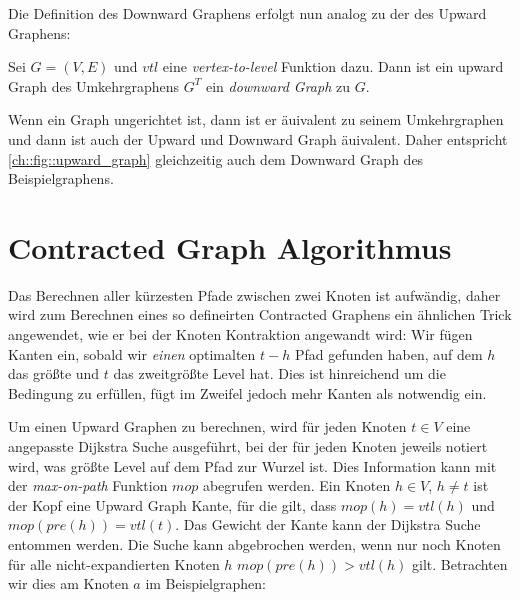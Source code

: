 Die Definition des Downward Graphens erfolgt nun analog zu der des Upward Graphens:

\begin{definition}
    Sei $G = (V, E)$ und ${vtl}$ eine \emph{vertex-to-level} Funktion dazu. Dann ist ein upward Graph des Umkehrgraphens $G^T$ ein \emph{downward Graph} zu $G$.
\end{definition}

Wenn ein Graph ungerichtet ist, dann ist er äuivalent zu seinem Umkehrgraphen und dann ist auch der Upward und Downward Graph äuivalent.
Daher entspricht \autoref{ch::fig::upward_graph} gleichzeitig auch dem Downward Graph des Beispielgraphens.


\section{Contracted Graph Algorithmus}

Das Berechnen aller kürzesten Pfade zwischen zwei Knoten ist aufwändig, daher wird zum Berechnen eines so defineirten Contracted Graphens ein ähnlichen Trick angewendet, wie er bei der Knoten Kontraktion angewandt wird:
Wir fügen Kanten ein, sobald wir \emph{einen} optimalten $t-h$ Pfad gefunden haben, auf dem $h$ das größte und $t$ das zweitgrößte Level hat.
Dies ist hinreichend um die Bedingung zu erfüllen, fügt im Zweifel jedoch mehr Kanten als notwendig ein.

Um einen Upward Graphen zu berechnen, wird für jeden Knoten $t \in V$ eine angepasste Dijkstra Suche ausgeführt, bei der für jeden Knoten jeweils notiert wird, was größte Level auf dem Pfad zur Wurzel ist.
Dies Information kann mit der \emph{max-on-path} Funktion ${mop}$ abegrufen werden.
Ein Knoten $h \in V$, $h \neq t$ ist der Kopf eine Upward Graph Kante, für die gilt, dass ${mop}(h) = {vtl}(h)$ und ${mop}({pre}(h)) = {vtl}(t)$.
Das Gewicht der Kante kann der Dijkstra Suche entommen werden.
Die Suche kann abgebrochen werden, wenn nur noch Knoten für alle nicht-expandierten Knoten $h$ ${mop}({pre}(h)) > {vtl}(h)$ gilt.
Betrachten wir dies am Knoten $a$ im Beispielgraphen:

